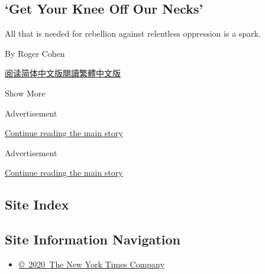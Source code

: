 \begin{enumerate}
  \hypertarget{get-your-knee-off-our-necks}{%
  \subsection{`Get Your Knee Off Our
  Necks'}\label{get-your-knee-off-our-necks}}

  All that is needed for rebellion against relentless oppression is a
  spark.

  By Roger Cohen

  \href{https://cn.nytimes3xbfgragh.onion/opinion/20200610/george-floyd-protests/}{阅读简体中文版}\href{https://cn.nytimes3xbfgragh.onion/opinion/20200610/george-floyd-protests/zh-hant/}{閱讀繁體中文版}
\end{enumerate}

Show More

Advertisement

\protect\hyperlink{after-mid1}{Continue reading the main story}

Advertisement

\protect\hyperlink{after-mktg}{Continue reading the main story}

\hypertarget{site-index}{%
\subsection{Site Index}\label{site-index}}

\hypertarget{site-information-navigation}{%
\subsection{Site Information
Navigation}\label{site-information-navigation}}

\begin{itemize}
\tightlist
\item
  \href{https://help.nytimes3xbfgragh.onion/hc/en-us/articles/115014792127-Copyright-notice}{©~2020~The
  New York Times Company}
\end{itemize}


